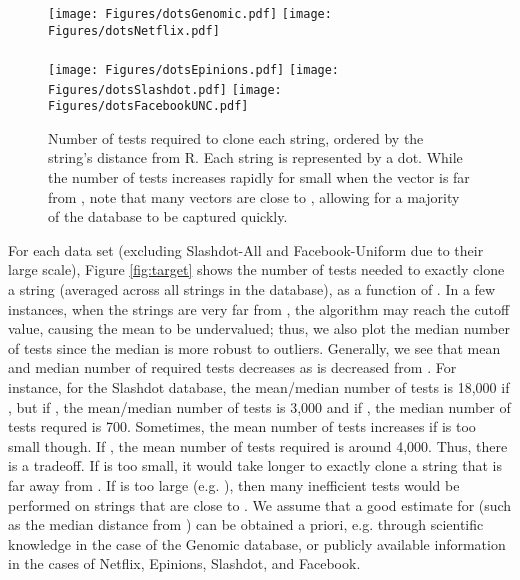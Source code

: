 \documentclass{article}
\begin{document}
\begin{figure*}
\centering
\texttt{[image: Figures/dotsGenomic.pdf]} \qquad
\texttt{[image: Figures/dotsNetflix.pdf]} \\ \quad \\
\texttt{[image: Figures/dotsEpinions.pdf]} \quad
\texttt{[image: Figures/dotsSlashdot.pdf]} \quad
\texttt{[image: Figures/dotsFacebookUNC.pdf]} 
\caption{Number of tests required to clone each string, ordered by the 
string's distance from R.  Each string is represented by a dot. While the number of tests increases
rapidly for small  when the vector is far from , note that many vectors are close to , allowing for a majority of the database to be captured quickly.}
\label{fig:dot}
\end{figure*}


For each data set (excluding Slashdot-All and Facebook-Uniform due to their large scale), Figure \ref{fig:target} shows the number of tests needed to exactly clone a string (averaged across all strings in the database), as a function of .  
In a few instances, when the strings are very far from , the algorithm may reach the 
cutoff value, causing the mean to be undervalued; thus, we also plot 
the median number of tests since the median is more robust to outliers.  Generally, we see that 
mean and median number of required tests decreases as  is decreased from .  For 
instance, for the Slashdot database, the mean/median number of tests is 18,000 
if , but if , the mean/median number of tests is 3,000 and if
, the median number of tests requred is 700.  Sometimes, the 
mean number of tests increases if  is too small though.  If 
, the mean number of tests required is around 4,000.  Thus, there is 
a tradeoff.  If  is too small, it would take longer to exactly clone a string that is 
far away from .  If  is too large (e.g. ), then many inefficient tests would 
be performed on strings that are close to .   
We assume that a good estimate for  (such as the median 
distance from ) can be obtained a priori, e.g. through scientific knowledge in the case of 
the Genomic database, or publicly available information in the cases of Netflix, Epinions, 
Slashdot, and Facebook.
\end{document}
